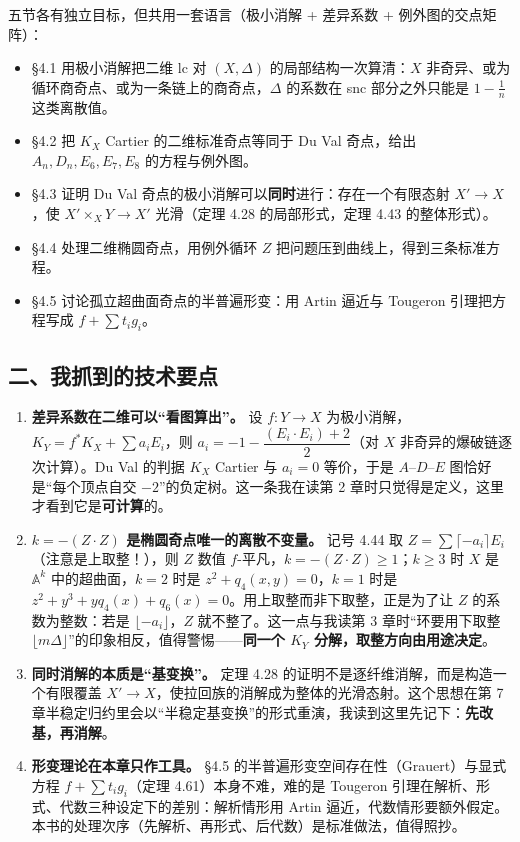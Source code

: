 五节各有独立目标，但共用一套语言（极小消解 + 差异系数 + 例外图的交点矩阵）：

\begin{itemize}
\item \S4.1 用极小消解把二维 lc 对 $(X,\Delta)$ 的局部结构一次算清：$X$ 非奇异、或为循环商奇点、或为一条链上的商奇点，$\Delta$ 的系数在 snc 部分之外只能是 $1-\frac1n$ 这类离散值。
\item \S4.2 把 $K_X$ Cartier 的二维标准奇点等同于 Du Val 奇点，给出 $A_n,D_n,E_6,E_7,E_8$ 的方程与例外图。
\item \S4.3 证明 Du Val 奇点的极小消解可以\textbf{同时}进行：存在一个有限态射 $X'\to X$，使 $X'\times_X Y\to X'$ 光滑（定理 4.28 的局部形式，定理 4.43 的整体形式）。
\item \S4.4 处理二维椭圆奇点，用例外循环 $Z$ 把问题压到曲线上，得到三条标准方程。
\item \S4.5 讨论孤立超曲面奇点的半普遍形变：用 Artin 逼近与 Tougeron 引理把方程写成 $f+\sum t_ig_i$。
\end{itemize}

\subsection*{二、我抓到的技术要点}

\begin{enumerate}
\item \textbf{差异系数在二维可以“看图算出”。} 设 $f\colon Y\to X$ 为极小消解，$K_Y=f^*K_X+\sum a_iE_i$，则 $a_i=-1-\dfrac{(E_i\cdot E_i)+2}{2}$（对 $X$ 非奇异的爆破链逐次计算）。Du Val 的判据 $K_X$ Cartier 与 $a_i=0$ 等价，于是 $A$--$D$--$E$ 图恰好是“每个顶点自交 $-2$”的负定树。这一条我在读第 2 章时只觉得是定义，这里才看到它是\textbf{可计算}的。
\item \textbf{$k=-(Z\cdot Z)$ 是椭圆奇点唯一的离散不变量。} 记号 4.44 取 $Z=\sum\lceil-a_i\rceil E_i$（注意是上取整！），则 $Z$ 数值 $f$-平凡，$k=-(Z\cdot Z)\ge1$；$k\ge3$ 时 $X$ 是 $\mathbb{A}^k$ 中的超曲面，$k=2$ 时是 $z^2+q_4(x,y)=0$，$k=1$ 时是 $z^2+y^3+yq_4(x)+q_6(x)=0$。用上取整而非下取整，正是为了让 $Z$ 的系数为整数：若是 $\lfloor-a_i\rfloor$，$Z$ 就不整了。这一点与我读第 3 章时“环要用下取整 $\lfloor m\Delta\rfloor$”的印象相反，值得警惕——\textbf{同一个 $K_Y$ 分解，取整方向由用途决定}。
\item \textbf{同时消解的本质是“基变换”。} 定理 4.28 的证明不是逐纤维消解，而是构造一个有限覆盖 $X'\to X$，使拉回族的消解成为整体的光滑态射。这个思想在第 7 章半稳定归约里会以“半稳定基变换”的形式重演，我读到这里先记下：\textbf{先改基，再消解}。
\item \textbf{形变理论在本章只作工具。} \S4.5 的半普遍形变空间存在性（Grauert）与显式方程 $f+\sum t_ig_i$（定理 4.61）本身不难，难的是 Tougeron 引理在解析、形式、代数三种设定下的差别：解析情形用 Artin 逼近，代数情形要额外假定。本书的处理次序（先解析、再形式、后代数）是标准做法，值得照抄。
\end{enumerate}

